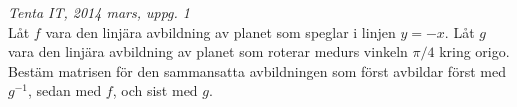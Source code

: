 {\it Tenta IT, 2014 mars, uppg. 1}\\
Låt $f$ vara den linjära avbildning av planet som speglar i linjen $y=-x$.
Låt $g$ vara den linjära avbildning av planet som roterar medurs vinkeln
$\pi/4$ kring origo. Bestäm matrisen för den sammansatta avbildningen som
först avbildar först med $g^{-1}$, sedan med $f$, och sist med $g$.